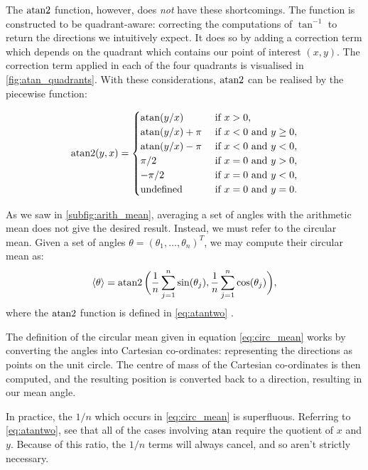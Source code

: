 The $\operatorname{atan2}$ function, however, does \emph{not} have these shortcomings. The function is
constructed to be quadrant-aware: correcting the computations of $\tan^{-1}$ to return the
directions we intuitively expect. It does so by adding a correction term which depends
on the quadrant which contains our point of interest $(x, y)$. The correction term applied
in each of the four quadrants is visualised in \cref{fig:atan_quadrants}. With these
considerations, $\operatorname{atan2}$ can be realised by the piecewise function:

\begin{equation}
\label{eq:atantwo}
	\atantwo(y, x) = 
	\begin{cases}
		\atan(y/x)          & \text{ if } x > 0, \\
		\atan(y/x) + \pi    & \text{ if } x < 0 \text{ and } y \geq 0, \\
		\atan(y/x) - \pi    & \text{ if } x < 0 \text{ and } y < 0, \\
		\pi/2               & \text{ if } x = 0 \text{ and } y > 0, \\
		-\pi/2              & \text{ if } x = 0 \text{ and } y < 0, \\
		\text{undefined}    & \text{ if } x = 0 \text{ and } y = 0. \\
	\end{cases}
\end{equation}

As we saw in \cref{subfig:arith_mean}, averaging a set of angles with the arithmetic mean
does not give the desired result. Instead, we must refer to the circular mean. Given a set
of angles $\theta = (\theta_1, \ldots, \theta_n)^T$, we may compute their circular mean
as:
\begin{equation}
	\label{eq:circ_mean}
	\langle \theta \rangle = \operatorname{atan2}\bigg(\frac{1}{n} \sum_{j=1}^n \sin(\theta_j), \frac{1}{n} 
    \sum_{j=1}^n \cos(\theta_j)\bigg),
\end{equation}
where the $\operatorname{atan2}$ function is defined in \cref{eq:atantwo} \parencite{fisher95}.

The definition of the circular mean given in equation \cref{eq:circ_mean} works by
converting the angles into Cartesian co-ordinates: representing the directions as points
on the unit circle. The centre of mass of the Cartesian co-ordinates is then computed, and
the resulting position is converted back to a direction, resulting in our mean angle.

In practice, the $1 / n$ which occurs in \cref{eq:circ_mean} is superfluous. Referring to
\cref{eq:atantwo}, see that all of the cases involving $\atan$ require the quotient of $x$
and $y$. Because of this ratio, the $1 / n$ terms will always cancel, and so aren't
strictly necessary.

